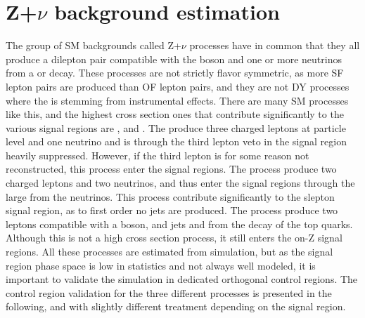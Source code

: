 \section{Z+$\nu$ background estimation}\label{sec:Znu}
\noindent\justify
The group of SM backgrounds called Z+$\nu$ processes have in common that they all produce a dilepton pair compatible with the \PZ boson and one or more neutrinos from a \PZ or \PW decay. 
These processes are not strictly flavor symmetric, as more SF lepton pairs are produced than OF lepton pairs, and they are not DY processes where the \ptmiss is stemming from instrumental effects. 
There are many SM processes like this, and the highest cross section ones that contribute significantly to the various signal regions are \PWZ, \PZZ and \ttZ. 
The \PWZ produce three charged leptons at particle level and one neutrino and is through the third lepton veto in the signal region heavily suppressed. 
However, if the third lepton is for some reason not reconstructed, this process enter the signal regions.  
The \PZZ process produce two charged leptons and two neutrinos, and thus enter the signal regions through the large \ptmiss from the neutrinos. 
This process contribute significantly to the slepton signal region, as to first order no jets are produced. 
\newpara
\noindent\justify
The \ttZ process produce two leptons compatible with a \PZ boson, and jets and \ptmiss from the decay of the top quarks. 
Although this is not a high cross section process, it still enters the on-Z signal regions. 
All these processes are estimated from simulation, but as the signal region phase space is low in statistics and not always well modeled, it is important to validate the simulation in dedicated orthogonal control regions. 
The control region validation for the three different processes is presented in the following, and with slightly different treatment depending on the signal region.  
